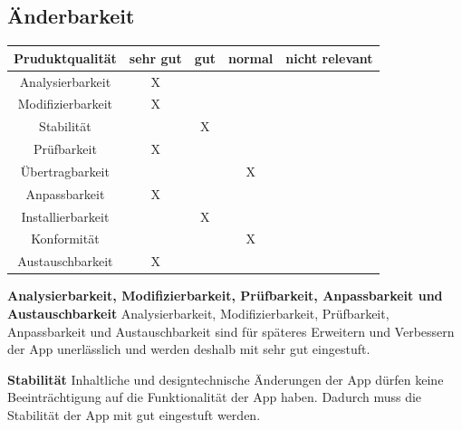 \documentclass[parskip=full]{scrartcl}
\begin{document}
\subsection{Änderbarkeit}
\begin{tabular}{| c | c | c | c | c |}
    \hline
    \textbf{Pruduktqualität} & \textbf{sehr gut} & \textbf{gut} & \textbf{normal} & \textbf{nicht relevant} \\ \hline
    Analysierbarkeit         & X                  &              &                 &                         \\ \hline
    Modifizierbarkeit        & X                  &              &                 &                         \\ \hline
    Stabilität               &                   & X             &                 &                         \\ \hline
    Prüfbarkeit              & X                  &              &                 &                         \\ \hline
    Übertragbarkeit          &                   &              & X                &                         \\ \hline
    Anpassbarkeit            & X                  &              &                 &                         \\ \hline
    Installierbarkeit        &                   & X             &                 &                         \\ \hline
    Konformität              &                   &              & X                &                         \\ \hline
    Austauschbarkeit         & X                  &              &                 &                         \\ \hline
\end{tabular}

\textbf{Analysierbarkeit, Modifizierbarkeit, Prüfbarkeit, Anpassbarkeit und Austauschbarkeit} \newline
Analysierbarkeit, Modifizierbarkeit, Prüfbarkeit, Anpassbarkeit und Austauschbarkeit sind für späteres Erweitern und Verbessern der App unerlässlich und werden deshalb mit sehr gut eingestuft.

\textbf{Stabilität}\newline
Inhaltliche und designtechnische Änderungen der App dürfen keine Beeinträchtigung auf die Funktionalität der App haben.
Dadurch muss die Stabilität der App mit gut eingestuft werden.
\end{document}
